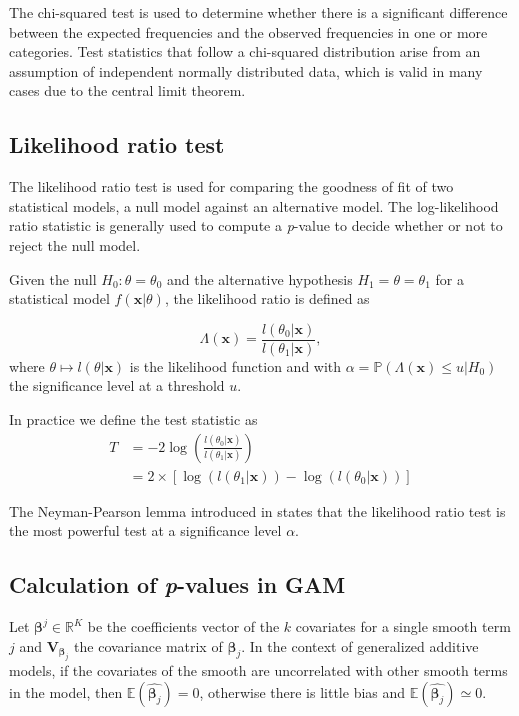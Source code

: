 \documentclass[]{book}
\begin{document}
The chi-squared test is used to determine whether there is a significant
difference between the expected frequencies and the observed frequencies
in one or more categories. Test statistics that follow a chi-squared
distribution arise from an assumption of independent normally
distributed data, which is valid in many cases due to the central limit
theorem.

\hypertarget{LRT}{%
\subsection{Likelihood ratio test}\label{LRT}}

The likelihood ratio test is used for comparing the goodness of fit of
two statistical models, a null model against an alternative model. The
log-likelihood ratio statistic is generally used to compute a \emph{p}-value
to decide whether or not to reject the null model.

Given the null \(H_0 : \theta = \theta_0\) and the alternative hypothesis
\(H_1 = \theta = \theta_1\) for a statistical model \(f(\boldsymbol{x}|\theta)\), the
likelihood ratio is defined as

\[\Lambda(\boldsymbol{x}) = \frac{l(\theta_0 | \boldsymbol{x})}{l(\theta_1 | \boldsymbol{x})},\] where
\(\theta \mapsto l(\theta|\boldsymbol{x})\) is the likelihood function and with
\(\alpha = \mathbb{P}(\Lambda(\boldsymbol{x}) \leq u | H_0)\) the significance level
at a threshold \(u\).

In practice we define the test statistic as \[\begin{aligned}
T & = -2 \log \left( \frac{l(\theta_0 | \boldsymbol{x})}{l(\theta_1 | \boldsymbol{x})} \right) \\
& = 2 \times [\log(l(\theta_1 | \boldsymbol{x})) - \log(l(\theta_0 | \boldsymbol{x}))]\end{aligned}\]

The Neyman-Pearson lemma introduced in \citep{neyman1933testing} states that
the likelihood ratio test is the most powerful test at a significance
level \(\alpha\).

\hypertarget{pvalGAM}{%
\subsection{\texorpdfstring{Calculation of \emph{p}-values in GAM}{Calculation of p-values in GAM}}\label{pvalGAM}}

Let \(\boldsymbol{\beta}^j \in \mathbb{R}^K\) be the coefficients vector of the \(k\)
covariates for a single smooth term \(j\) and \(\mathbf{V}_{\boldsymbol{\beta}_j}\) the
covariance matrix of \(\boldsymbol{\beta}_j\). In the context of generalized additive
models, if the covariates of the smooth are uncorrelated with other
smooth terms in the model, then \(\mathbb{E}(\hat{\boldsymbol{\beta}_j}) = 0\),
otherwise there is little bias and
\(\mathbb{E}(\hat{\boldsymbol{\beta}_j}) \simeq 0\).
\end{document}
